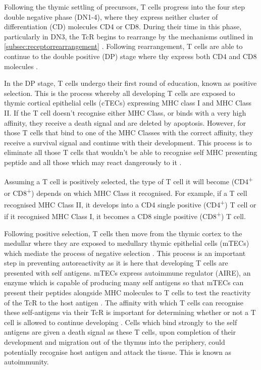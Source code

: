 Following the thymic settling of precursors, T cells progress into the four step double negative phase (DN1-4), where they express neither cluster of differentiation (CD) molecules CD4 or CD8.
During their time in this phase, particularly in DN3, the TcR begins to rearrange by the mechanisms outlined in \cref{subsec:receptorrearrangement} \citep{Starr2003}.
Following rearrangement, T cells are able to continue to the double positive (DP) stage where thy express both CD4 and CD8 molecules \citep{Zuniga1996}.


In the DP stage, T cells undergo their first round of education, known as positive selection.
This is the process whereby all developing T cells are exposed to thymic cortical epithelial cells (cTECs) expressing MHC class I and MHC Class II.
If the T cell doesn't recognise either MHC Class, or binds with a very high affinity, they receive a death signal and are deleted by apoptosis.
However, for those T cells that bind to one of the MHC Classes with the correct affinity, they receive a survival signal and continue with their development.
This process is to eliminate all those T cells that wouldn't be able to recognise self MHC presenting peptide and all those which  may react dangerously to it \citep{Jameson1998, Starr2003}.

Assuming a T cell is positively selected, the type of T cell it will become (CD4\textsuperscript{+} or CD8\textsuperscript{+}) depends on which MHC Class it recognised.
For example, if a T cell recognised MHC Class II, it develops into a CD4 single positive (CD4\textsuperscript{+}) T cell or if it recognised MHC Class I, it becomes a CD8 single positive (CD8\textsuperscript{+}) T cell.

Following positive selection, T cells then move from the thymic cortex to the medullar where they are exposed to medullary thymic epithelial cells (mTECs) which mediate the process of negative selection \citep{Starr2003}.
This process is an important step in preventing autoreactivity as it is here that developing T cells are presented with self antigens.
mTECs express autoimmune regulator (AIRE), an enzyme which is capable of producing many self antigens so that mTECs can present their peptides alongside MHC molecules to T cells to test the reactivity of the TcR to the host antigen \citep{Anderson2011}.
The affinity with which T cells can recognise these self-antigens via their TcR is important for determining whether or not a T cell is allowed to continue developing \citep{Ashton1994}.
Cells which bind strongly to the self antigens are given a death signal as these T cells, upon completion of their development and migration out of the thymus into the periphery, could potentially recognise host antigen and attack the tissue.
This is known as autoimmunity.


